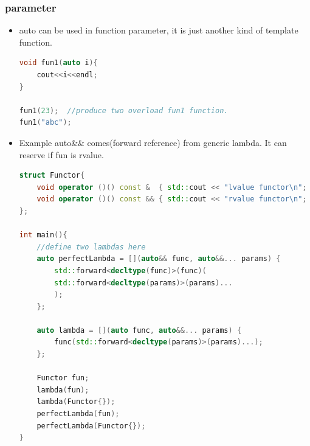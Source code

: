 \documentclass[a4paper,11pt,twoside]{book}
\begin{document}
\subsubsection{parameter}
\begin{itemize}
\item auto can be used in function parameter, it is just another kind of template function.
\begin{lstlisting}[frame=single, language=c++]
void fun1(auto i){
	cout<<i<<endl;
}

fun1(23);  //produce two overload fun1 function.
fun1("abc");
\end{lstlisting}

\item Example auto\&\& comes(forward reference) from generic lambda. It can reserve if fun is rvalue.
\begin{lstlisting}[frame=single, language=c++]
struct Functor{
	void operator ()() const &  { std::cout << "lvalue functor\n"; }
	void operator ()() const && { std::cout << "rvalue functor\n"; }
};

int main(){
	//define two lambdas here
	auto perfectLambda = [](auto&& func, auto&&... params) {
		std::forward<decltype(func)>(func)(
		std::forward<decltype(params)>(params)...
		);
	};

	auto lambda = [](auto func, auto&&... params) {
		func(std::forward<decltype(params)>(params)...);
	};

	Functor fun;
	lambda(fun);
	lambda(Functor{});
	perfectLambda(fun);
	perfectLambda(Functor{});
}
\end{lstlisting}
\end{itemize}
\end{document}
